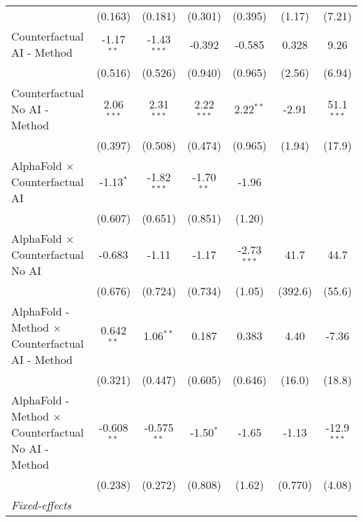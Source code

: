 \begin{tabular}{lcccccc}
                                                              & (0.163)       & (0.181)       & (0.301)      & (0.395)       & (1.17)        & (7.21)\\   
   Counterfactual AI - Method                                 & -1.17$^{**}$  & -1.43$^{***}$ & -0.392       & -0.585        & 0.328         & 9.26\\   
                                                              & (0.516)       & (0.526)       & (0.940)      & (0.965)       & (2.56)        & (6.94)\\   
   Counterfactual No AI - Method                              & 2.06$^{***}$  & 2.31$^{***}$  & 2.22$^{***}$ & 2.22$^{**}$   & -2.91         & 51.1$^{***}$\\   
                                                              & (0.397)       & (0.508)       & (0.474)      & (0.965)       & (1.94)        & (17.9)\\   
   AlphaFold $\times$ Counterfactual AI                       & -1.13$^{*}$   & -1.82$^{***}$ & -1.70$^{**}$ & -1.96         &               &   \\   
                                                              & (0.607)       & (0.651)       & (0.851)      & (1.20)        &               &   \\   
   AlphaFold $\times$ Counterfactual No AI                    & -0.683        & -1.11         & -1.17        & -2.73$^{***}$ & 41.7          & 44.7\\   
                                                              & (0.676)       & (0.724)       & (0.734)      & (1.05)        & (392.6)       & (55.6)\\   
   AlphaFold - Method $\times$ Counterfactual AI - Method     & 0.642$^{**}$  & 1.06$^{**}$   & 0.187        & 0.383         & 4.40          & -7.36\\   
                                                              & (0.321)       & (0.447)       & (0.605)      & (0.646)       & (16.0)        & (18.8)\\   
   AlphaFold - Method $\times$ Counterfactual No AI - Method  & -0.608$^{**}$ & -0.575$^{**}$ & -1.50$^{*}$  & -1.65         & -1.13         & -12.9$^{***}$\\   
                                                              & (0.238)       & (0.272)       & (0.808)      & (1.62)        & (0.770)       & (4.08)\\   
   \midrule
   \emph{Fixed-effects}\\

\end{tabular}
